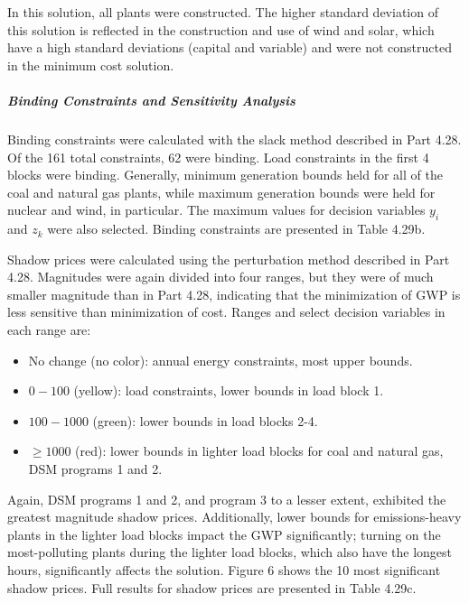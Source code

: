 \documentclass{article}
\begin{document}
		In this solution, all plants were constructed. The higher standard deviation of this solution is reflected in the construction and use of wind and solar, which have a high standard deviations (capital and variable) and were not constructed in the minimum cost solution.
	
	\subparagraph{Binding Constraints and Sensitivity Analysis}
		Binding constraints were calculated with the slack method described in Part 4.28. Of the 161 total constraints, 62 were binding. Load constraints in the first 4 blocks were binding. Generally, minimum generation bounds held for all of the coal and natural gas plants, while maximum generation bounds were held for nuclear and wind, in particular. The maximum values for decision variables $y_i$ and $z_k$ were also selected. Binding constraints are presented in Table 4.29b.
		
		Shadow prices were calculated using the perturbation method described in Part 4.28. Magnitudes were again divided into four ranges, but they were of much smaller magnitude than in Part 4.28, indicating that the minimization of GWP is less sensitive than minimization of cost. Ranges and select decision variables in each range are:
		
		\begin{itemize}
			\item No change (no color): annual energy constraints, most upper bounds.
			\item $0 - 100$ (yellow): load constraints, lower bounds in load block 1.
			\item $100 - 1000$ (green): lower bounds in load blocks 2-4.
			\item $\geq 1000$ (red): lower bounds in lighter load blocks for coal and natural gas, DSM programs 1 and 2.
		\end{itemize}

		Again, DSM programs 1 and 2, and program 3 to a lesser extent, exhibited the greatest magnitude shadow prices. Additionally, lower bounds for emissions-heavy plants in the lighter load blocks impact the GWP significantly; turning on the most-polluting plants during the lighter load blocks, which also have the longest hours, significantly affects the solution. Figure 6 shows the 10 most significant shadow prices. Full results for shadow prices are presented in Table 4.29c.
		
\end{document}
